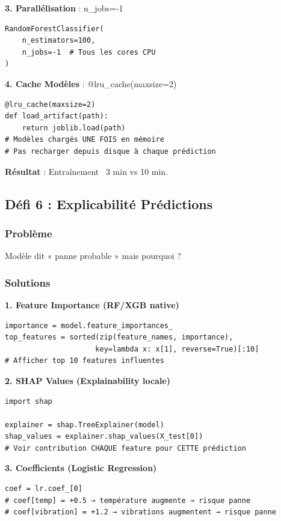 \documentclass[12pt,a4paper,french]{article}
\begin{document}
\textbf{3. Parallélisation} : n\_jobs=-1

\begin{lstlisting}
RandomForestClassifier(
    n_estimators=100,
    n_jobs=-1  # Tous les cores CPU
)
\end{lstlisting}

\textbf{4. Cache Modèles} : @lru\_cache(maxsize=2)

\begin{lstlisting}
@lru_cache(maxsize=2)
def load_artifact(path):
    return joblib.load(path)
# Modèles chargés UNE FOIS en mémoire
# Pas recharger depuis disque à chaque prédiction
\end{lstlisting}

\textbf{Résultat} : Entraînement ~3 min vs 10 min.

\subsection{Défi 6 : Explicabilité Prédictions}

\subsubsection{Problème}

Modèle dit « panne probable » mais pourquoi ?

\subsubsection{Solutions}

\textbf{1. Feature Importance (RF/XGB native)}

\begin{lstlisting}
importance = model.feature_importances_
top_features = sorted(zip(feature_names, importance), 
                     key=lambda x: x[1], reverse=True)[:10]
# Afficher top 10 features influentes
\end{lstlisting}

\textbf{2. SHAP Values (Explainability locale)}

\begin{lstlisting}
import shap

explainer = shap.TreeExplainer(model)
shap_values = explainer.shap_values(X_test[0])
# Voir contribution CHAQUE feature pour CETTE prédiction
\end{lstlisting}

\textbf{3. Coefficients (Logistic Regression)}

\begin{lstlisting}
coef = lr.coef_[0]
# coef[temp] = +0.5 → température augmente → risque panne
# coef[vibration] = +1.2 → vibrations augmentent → risque panne
\end{lstlisting}
\end{document}
